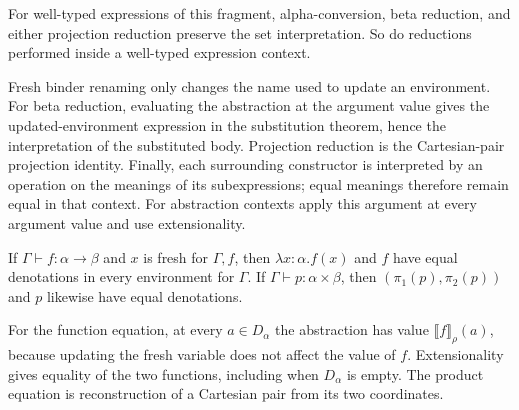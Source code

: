 \begin{corollary}
For well-typed expressions of this fragment, alpha-conversion, beta
reduction, and either projection reduction preserve the set interpretation.
So do reductions performed inside a well-typed expression context.
\end{corollary}
\Proof
Fresh binder renaming only changes the name used to update an environment.
For beta reduction, evaluating the abstraction at the argument value gives
the updated-environment expression in the substitution theorem, hence the
interpretation of the substituted body. Projection reduction is the
Cartesian-pair projection identity. Finally, each surrounding constructor
is interpreted by an operation on the meanings of its subexpressions;
equal meanings therefore remain equal in that context. For abstraction
contexts apply this argument at every argument value and use extensionality.
\Done

\begin{proposition}
If $\Gamma\vdash f:\alpha\to\beta$ and $x$ is fresh for $\Gamma,f$,
then $\lambda x:\alpha.f(x)$ and $f$ have equal denotations in every
environment for $\Gamma$. If $\Gamma\vdash p:\alpha\times\beta$,
then $(\pi_1(p),\pi_2(p))$ and $p$ likewise have equal denotations.
\end{proposition}
\Proof
For the function equation, at every $a\in D_\alpha$ the abstraction
has value $\llbracket f\rrbracket_\rho(a)$, because updating the fresh
variable does not affect the value of $f$. Extensionality gives equality
of the two functions, including when $D_\alpha$ is empty. The product
equation is reconstruction of a Cartesian pair from its two coordinates.
\Done

